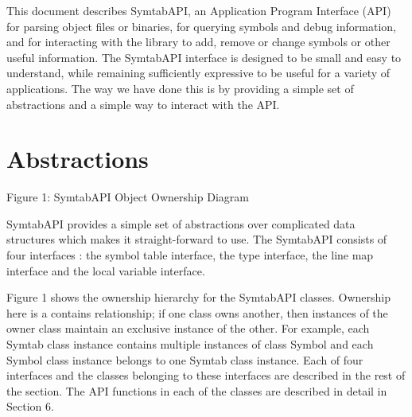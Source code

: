 This document describes SymtabAPI, an Application Program Interface (API) for parsing object files or binaries, for querying symbols and debug information, and for interacting with the library to add, remove or change symbols or other useful information. 
The SymtabAPI interface is designed to be small and easy to understand, while remaining sufficiently expressive to be useful for a variety of applications. The way we have done this is by providing a simple set of abstractions and a simple way to interact with the API. 

\section{Abstractions}
\label{sec:intro}

Figure 1: SymtabAPI Object Ownership Diagram

SymtabAPI provides a simple set of abstractions over complicated data structures which makes it straight-forward to use. The SymtabAPI consists of four interfaces : the symbol table interface, the type interface, the line map interface and the local variable interface. 

Figure 1 shows the ownership hierarchy for the SymtabAPI classes. Ownership here is a contains relationship; if one class owns another, then instances of the owner class maintain an exclusive instance of the other. For example, each Symtab class instance contains multiple instances of class Symbol and each Symbol class instance belongs to one Symtab class instance. Each of four interfaces and the classes belonging to these interfaces are described in the rest of the section. The API functions in each of the classes are described in detail in Section 6.

